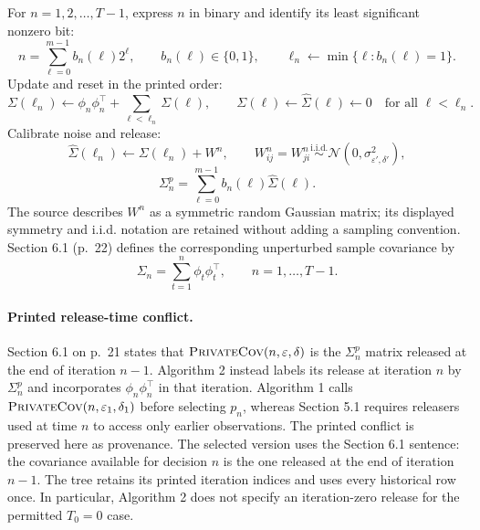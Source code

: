 \documentclass{article}
\begin{document}
For $n=1,2,\ldots,T-1$, express $n$ in binary and identify its least significant nonzero bit:
\[
n=\sum_{\ell=0}^{m-1}b_n(\ell)2^\ell,
\qquad b_n(\ell)\in\{0,1\},
\qquad \ell_n\leftarrow\min\{\ell:b_n(\ell)=1\}.
\]
Update and reset in the printed order:
\[
\Sigma(\ell_n)\leftarrow
\phi_n\phi_n^{\top}+\sum_{\ell<\ell_n}\Sigma(\ell),
\qquad
\Sigma(\ell)\leftarrow\widehat\Sigma(\ell)\leftarrow0
\quad\text{for all }\ell<\ell_n.
\]
Calibrate noise and release:
\[
\widehat\Sigma(\ell_n)\leftarrow\Sigma(\ell_n)+W^n,
\qquad
W^n_{ij}=W^n_{ji}\overset{\mathrm{i.i.d.}}{\sim}
\mathcal N(0,\sigma_{\varepsilon',\delta'}^2),
\]
\[
\Sigma_n^p=\sum_{\ell=0}^{m-1}b_n(\ell)\widehat\Sigma(\ell).
\]
The source describes $W^n$ as a symmetric random Gaussian matrix; its displayed symmetry and i.i.d. notation are retained without adding a sampling convention. Section 6.1 (p.~22) defines the corresponding unperturbed sample covariance by
\[
\Sigma_n=\sum_{t=1}^{n}\phi_t\phi_t^{\top},
\qquad n=1,\ldots,T-1.
\]

\paragraph{Printed release-time conflict.}
Section 6.1 on p.~21 states that
$\textsc{PrivateCov}(n,\varepsilon,\delta)$ is the $\Sigma_n^p$ matrix released at the end of iteration $n-1$. Algorithm 2 instead labels its release at iteration $n$ by $\Sigma_n^p$ and incorporates $\phi_n\phi_n^{\top}$ in that iteration. Algorithm 1 calls $\textsc{PrivateCov}(n,\varepsilon_1,\delta_1)$ before selecting $p_n$, whereas Section 5.1 requires releasers used at time $n$ to access only earlier observations. The printed conflict is preserved here as provenance. The selected version uses the Section 6.1 sentence: the covariance available for decision $n$ is the one released at the end of iteration $n-1$. The tree retains its printed iteration indices and uses every historical row once. In particular, Algorithm 2 does not specify an iteration-zero release for the permitted $T_0=0$ case.
\end{document}
